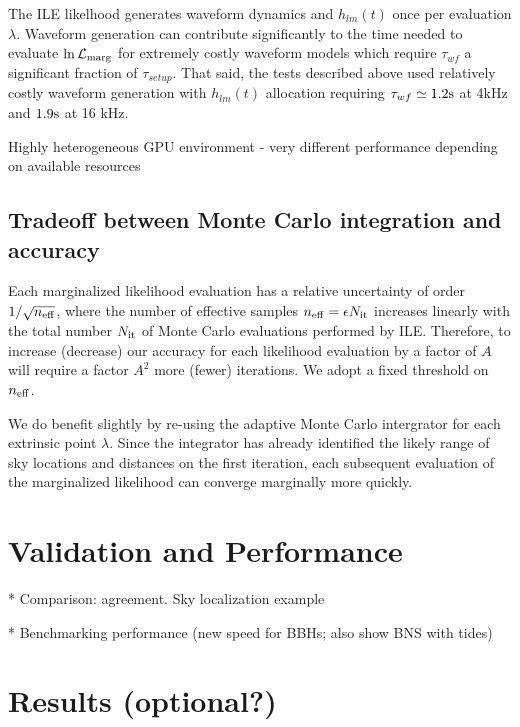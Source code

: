 \documentclass[twocolumn,prd,nofootinbib]{revtex4}
\newcommand\unit[1]{{\rm #1}}
\newcommand\ILE{ILE}
\newcommand\editremark[1]{{\color{red} #1}}
\begin{document}
The \ILE{} likelhood  generates waveform dynamics and $h_{lm}(t)$ once per evaluation $\lambda$.   Waveform generation can contribute significantly to the
time needed to evaluate  $\ln {\cal L}_{\rm marg}$ for extremely costly
waveform models which require $\tau_{wf} $ a significant fraction of $  \tau_{setup}$.   That said, the tests described
above used relatively costly waveform generation with $h_{lm}(t)$ allocation requiring $\tau_{wf} \simeq 1.2 \unit{s}$
at 4kHz and $1.9\unit{s}$ at 16 kHz.


\editremark{Highly heterogeneous GPU environment - very different performance depending on available resources}

\subsection{Tradeoff between Monte Carlo integration and accuracy}

Each marginalized likelihood evaluation has a relative uncertainty of order  $1/\sqrt{n_{\rm eff}}$, where the number of
effective samples $n_{\rm eff}=\epsilon N_{\rm it}$ increases linearly with the total number $N_{\rm it}$ of Monte Carlo
evaluations performed by \ILE{}.  Therefore, to increase (decrease) our accuracy for each likelihood evaluation by a factor of $A$
will require a factor $A^2$ more (fewer) iterations.   
%
We adopt a fixed threshold on $n_{\rm eff}$.  


We do benefit slightly by re-using the adaptive Monte Carlo intergrator for each extrinsic point $\lambda$.  Since the
integrator has already identified the likely range of sky locations and distances on the first iteration, each
subsequent evaluation of the marginalized likelihood can converge marginally more quickly.



\section{Validation and Performance}
\label{sec:demo}

\begin{figure}

\end{figure}

* Comparison: agreement.  Sky localization example

* Benchmarking performance (new speed for BBHs; also show BNS with tides)


\section{ Results (optional?)}
\end{document}
